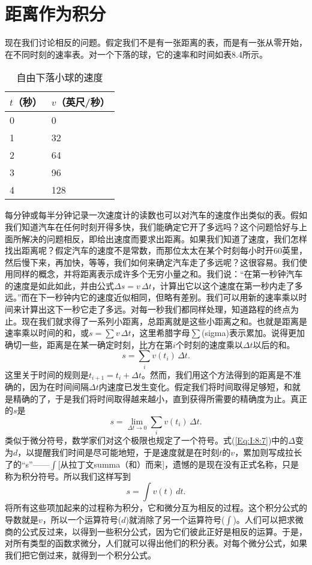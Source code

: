 \section{距离作为积分}
现在我们讨论相反的问题。假定我们不是有一张距离的表，而是有一张从零开始，在不同时刻的速率表。对一个下落的球，它的速率和时间如表8.4所示。
\begin{table}[H]
\centering
\caption{自由下落小球的速度}
\label{tab:8.2}
\medskip 
\begin{tabular}{@{}ll@{}}
\toprule
$t$（秒） & $v$（英尺/秒）  \\ \midrule
0  & 0  \\
1  & 32 \\
2  & 64 \\
3  & 96 \\
4  & 128 
 \\ \bottomrule
\end{tabular}
\end{table}

每分钟或每半分钟记录一次速度计的读数也可以对汽车的速度作出类似的表。假如我们知道汽车在任何时刻开得多快，我们能确定它开了多远吗？这个问题恰好与上面所解决的问题相反，即给出速度而要求出距离。如果我们知道了速度，我们怎样找出距离呢？假定汽车的速度不是常数，而那位太太在某个时刻每小时开60英里，然后慢下来，再加快，等等，我们如何来确定汽车走了多远呢？这很容易。我们使用同样的概念，并将距离表示成许多个无穷小量之和。我们说：“在第一秒钟汽车的速度是如此如此，并由公式$\Delta s=v\,\Delta t$，计算出它以这个速度在第一秒内走了多远。”而在下一秒钟内它的速度近似相同，但略有差别。我们可以用新的速率乘以时间来计算出这下一秒它走了多远。对每一秒我们都同样处理，知道路程的终点为止。现在我们就求得了一系列小距离，总距离就是这些小距离之和。也就是距离是速率乘以时间的和，或$s=\sum v\,\Delta t$，这里希腊字母$\sum$(sigma)表示累加。说得更加确切一些，距离是在某一确定时刻，比方在第$i$个时刻的速度乘以$\Delta t$以后的和。
\begin{equation}
\label{Eq:I:8:6}
s=\sum_iv(t_i)\,\Delta t.
\end{equation}
这里关于时间的规则是$t_{i+1}=t_i+\Delta t$。然而，我们用这个方法得到的距离是不准确的，因为在时间间隔$\Delta t$内速度已发生变化。假定我们将时间取得足够短，和就是精确的了，于是我们将时间取得越来越小，直到获得所需要的精确度为止。真正的$s$是
\begin{equation}
\label{Eq:I:8:7}
s=\lim_{\Delta t\to0}\sum_iv(t_i)\,\Delta t.
\end{equation}
类似于微分符号，数学家们对这个极限也规定了一个符号。式(\ref{Eq:I:8:7})中的$\Delta$变为$d$，以提醒我们时间是尽可能地短，于是速度就是在时刻$t$的$v$，累加则写成拉长了的“s”——$\int$[从拉丁文summa（和）而来]，遗憾的是现在没有正式名称，只是称为积分符号。所以我们这样写到
\begin{equation}
\label{Eq:I:8:8}
s=\int v(t)\,dt.
\end{equation}
将所有这些项加起来的过程称为积分，它和微分互为相反的过程。这个积分公式的导数就是$v$，所以一个运算符号($d$)就消除了另一个运算符号($\int$)。人们可以把求微商的公式反过来，以得到一些积分公式，因为它们彼此正好是相反的运算。于是，对所有类型的函数求微分，人们就可以得出他们的积分表。对每个微分公式，如果我们把它倒过来，就得到一个积分公式。

